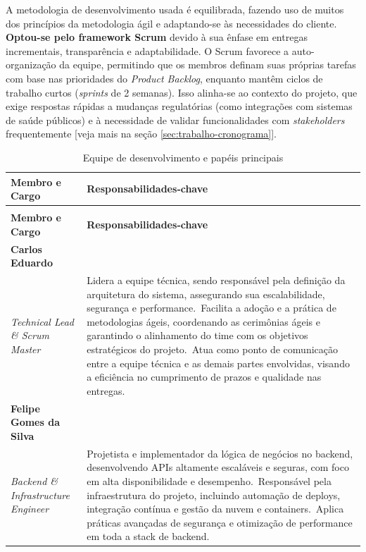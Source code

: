 \documentclass[a5paper, 12pt]{article}
\begin{document}
A metodologia de desenvolvimento usada é equilibrada, fazendo uso de muitos dos princípios da metodologia ágil e adaptando-se às necessidades do cliente. \textbf{Optou-se pelo framework Scrum} devido à sua ênfase em entregas incrementais, transparência e adaptabilidade. O Scrum favorece a auto-organização da equipe, permitindo que os membros definam suas próprias tarefas com base nas prioridades do \textit{Product Backlog}, enquanto mantêm ciclos de trabalho curtos (\textit{sprints} de 2 semanas). Isso alinha-se ao contexto do projeto, que exige respostas rápidas a mudanças regulatórias (como integrações com sistemas de saúde públicos) e à necessidade de validar funcionalidades com \textit{stakeholders} frequentemente [veja mais na seção \ref{sec:trabalho-cronograma}].

\newpage
\begin{longtable}[c]{@{} >{\raggedright\arraybackslash}p{4.5cm}>{\raggedright\arraybackslash}p{11cm} @{}}
  \caption{Equipe de desenvolvimento e papéis principais} \\
  \toprule
  \textbf{Membro e Cargo} & \textbf{Responsabilidades‑chave} \\
  \midrule
\endfirsthead

\multicolumn{2}{@{}l}{\textbf{Continuação da página anterior}} \\
  \toprule
  \textbf{Membro e Cargo} & \textbf{Responsabilidades‑chave} \\
  \midrule
\endhead

\bottomrule
\endfoot

\textbf{Carlos Eduardo} \\ \textit{Technical Lead \& Scrum Master} &
  Lidera a equipe técnica, sendo responsável pela definição da arquitetura do sistema, assegurando sua escalabilidade, segurança e performance.\
  Facilita a adoção e a prática de metodologias ágeis, coordenando as cerimônias ágeis e garantindo o alinhamento do time com os objetivos estratégicos do projeto.\
  Atua como ponto de comunicação entre a equipe técnica e as demais partes envolvidas, visando a eficiência no cumprimento de prazos e qualidade nas entregas. \\

\textbf{Felipe Gomes da Silva} \\ \textit{Backend \& Infrastructure Engineer} &
  Projetista e implementador da lógica de negócios no backend, desenvolvendo APIs altamente escaláveis e seguras, com foco em alta disponibilidade e desempenho.\
  Responsável pela infraestrutura do projeto, incluindo automação de deploys, integração contínua e gestão da nuvem e containers.\
  Aplica práticas avançadas de segurança e otimização de performance em toda a stack de backend. \\


\end{longtable}
\end{document}
